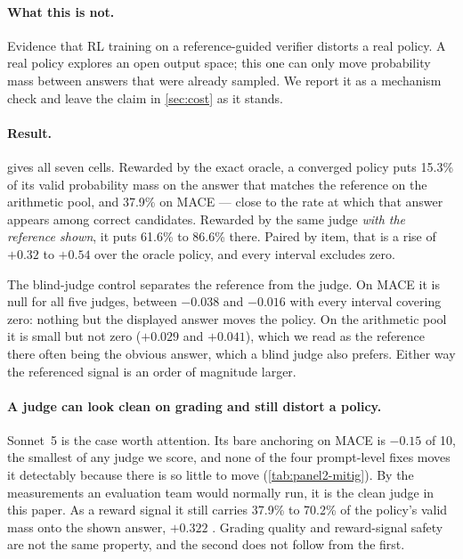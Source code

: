 \paragraph{What this is not.} Evidence that RL training on a reference-guided verifier distorts a
real policy. A real policy explores an open output space; this one can only move probability mass
between answers that were already sampled. We report it as a mechanism check and leave the claim in
\cref{sec:cost} as it stands.

\paragraph{Result.}  gives all seven cells. Rewarded by the exact oracle, a
converged policy puts 15.3\% of its valid probability mass on the answer that matches the reference
on the arithmetic pool, and 37.9\% on \textsc{MACE} --- close to the rate at which that answer
appears among correct candidates. Rewarded by the same judge \emph{with the reference shown}, it
puts 61.6\% to 86.6\% there. Paired by item, that is a rise of $+0.32$ to $+0.54$ over the oracle
policy, and every interval excludes zero.

The blind-judge control separates the reference from the judge. On \textsc{MACE} it is null for all
five judges, between $-0.038$ and $-0.016$ with every interval covering zero: nothing but the
displayed answer moves the policy. On the arithmetic pool it is small but not zero ($+0.029$ and
$+0.041$), which we read as the reference there often being the obvious answer, which a blind judge
also prefers. Either way the referenced signal is an order of magnitude larger.

\paragraph{A judge can look clean on grading and still distort a policy.} Sonnet~5 is the case worth
attention. Its bare anchoring on \textsc{MACE} is $-0.15$ of 10, the smallest of any judge we score,
and none of the four prompt-level fixes moves it detectably because there is so little to move
(\cref{tab:panel2-mitig}). By the measurements an evaluation team would normally run, it is the
clean judge in this paper. As a reward signal it still carries 37.9\% to 70.2\% of the policy's
valid mass onto the shown answer, $+0.322$ . Grading quality and reward-signal
safety are not the same property, and the second does not follow from the first.

